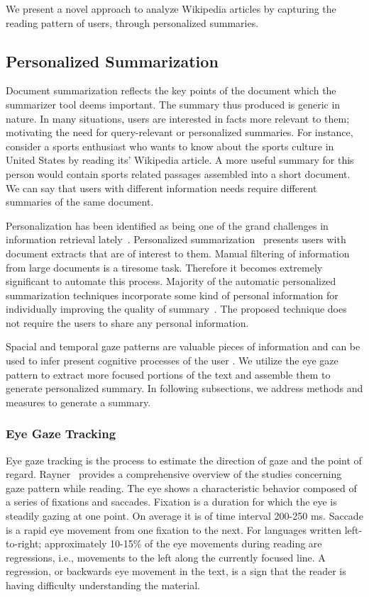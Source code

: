 \documentclass[12pt]{article}
\begin{document}
We present a novel approach to analyze Wikipedia articles by capturing the reading pattern of users, through personalized summaries. 

\subsection{Personalized Summarization}

Document summarization reflects the key points of the document which the summarizer tool deems important. The summary thus produced is generic in nature. In many situations, users are interested in facts more relevant to them; motivating the need for query-relevant or personalized summaries. For instance, consider a sports enthusiast who wants to know about the sports culture in United States by reading its' Wikipedia article. A more useful summary for this person would contain sports related passages assembled into a short document. We can say that users with different information needs require different summaries of the same document.

Personalization has been identified as being one of the grand challenges in information retrieval lately~\cite{belkin2008some}. Personalized summarization~\cite{berkovsky2008aspect} presents users with document extracts that are of interest to them. Manual filtering of information from large documents is a tiresome task. Therefore it becomes extremely significant to automate this process. Majority of the automatic personalized summarization techniques incorporate some kind of personal information for individually improving the quality of summary~\cite{moro2012personalized, wu2008personalized, kumar2008generating}. The proposed technique does not require the users to share any personal information. 


Spacial and temporal gaze patterns are valuable pieces of information and can be used to infer present cognitive processes of the user \cite{Beymer:2005:WSC:1056808.1057055}. We utilize the eye gaze pattern to extract more focused portions of the text and assemble them to generate personalized summary. In following subsections, we address methods and measures to generate a summary.

\subsubsection{Eye Gaze Tracking}
Eye gaze tracking is the process to estimate the direction of gaze and the point of regard. Rayner~\cite{rayner1998eye} provides a comprehensive overview of the studies concerning gaze pattern while reading. The eye shows a characteristic behavior composed of a series of fixations and saccades. Fixation is a duration for which the eye is steadily gazing at one point. On average it is of time interval 200-250 ms. Saccade is a rapid eye movement from one fixation to the next. For languages written left-to-right; approximately 10-15\% of the eye movements during reading are regressions, i.e., movements to the left along the currently focused line. A regression, or backwards eye movement in the text, is a sign that the
reader is having difficulty understanding the material.
\end{document}

